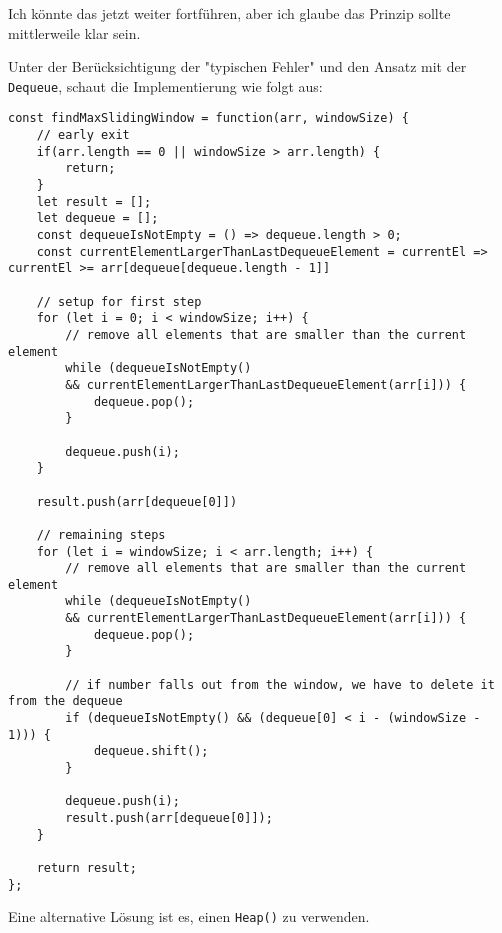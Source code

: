 \documentclass{book}
\begin{document}
Ich könnte das jetzt weiter fortführen, aber ich glaube das Prinzip sollte mittlerweile klar sein.

Unter der Berücksichtigung der "typischen Fehler" und den Ansatz mit der \lstinline|Dequeue|, schaut die Implementierung wie folgt aus:

\begin{lstlisting}[caption=My Javascript Example]
const findMaxSlidingWindow = function(arr, windowSize) {  
	// early exit
	if(arr.length == 0 || windowSize > arr.length) {
		return;
	}
	let result = [];
	let dequeue = [];
	const dequeueIsNotEmpty = () => dequeue.length > 0;
	const currentElementLargerThanLastDequeueElement = currentEl => currentEl >= arr[dequeue[dequeue.length - 1]]
	
	// setup for first step
	for (let i = 0; i < windowSize; i++) {
		// remove all elements that are smaller than the current element
		while (dequeueIsNotEmpty() 
		&& currentElementLargerThanLastDequeueElement(arr[i])) {
			dequeue.pop();
		}
		
		dequeue.push(i);
	}
	
	result.push(arr[dequeue[0]])
	
	// remaining steps  
	for (let i = windowSize; i < arr.length; i++) {
		// remove all elements that are smaller than the current element
		while (dequeueIsNotEmpty() 
		&& currentElementLargerThanLastDequeueElement(arr[i])) {
			dequeue.pop();
		}
		
		// if number falls out from the window, we have to delete it from the dequeue
		if (dequeueIsNotEmpty() && (dequeue[0] < i - (windowSize - 1))) {
			dequeue.shift();
		}
		
		dequeue.push(i);
		result.push(arr[dequeue[0]]);
	}
	
	return result;
};
\end{lstlisting}

Eine alternative Lösung ist es, einen \lstinline|Heap()| zu verwenden.
\medskip
\end{document}

